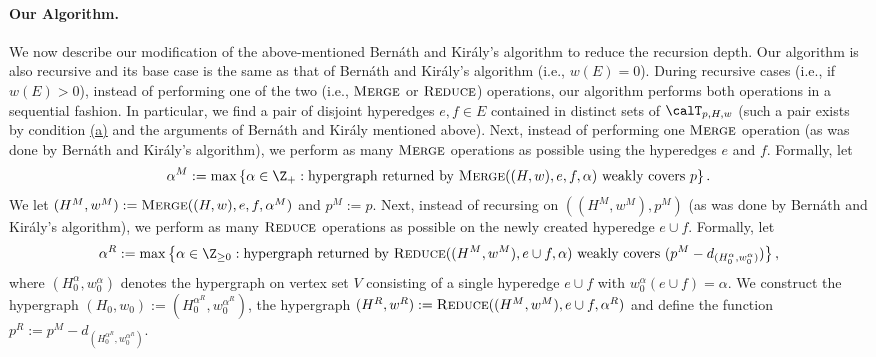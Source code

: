 \documentclass{article}
\newcommand{\maximalTightSetFamily}[1]{\ensuremath{\calT_{#1}}\xspace}
\newcommand{\shubhang}[1]{{\color{blue}[{\tiny Shubhang: \bf #1}]\marginpar{\color{blue}*}}}
\newcommand{\merge}{\ensuremath{\textsc{Merge}}\xspace}
\newcommand{\reduce}{\ensuremath{\textsc{Reduce}}\xspace}
\begin{document}
\paragraph{Our Algorithm.}
We now describe our modification of the above-mentioned Bern\'{a}th and Kir\'{a}ly's algorithm to reduce the recursion depth. Our algorithm is also recursive and its 
base case is the same as that of Bern\'{a}th and Kir\'{a}ly's algorithm (i.e., $w(E)=0$). During recursive cases (i.e., if $w(E) > 0$), instead of performing one of the two (i.e., \merge or  \reduce) operations, our algorithm performs both operations in a sequential fashion. In particular, we find a pair of disjoint hyperedges $e, f\in E$ contained in distinct sets of $\maximalTightSetFamily{p, H, w}$ (such a pair exists by condition \hyperlink{WeakToStrong(a)}{(a)} and the arguments of Bern\'{a}th and Kir\'{a}ly mentioned above). Next, 
instead of performing one \merge operation (as was done by Bern\'{a}th and Kir\'{a}ly's algorithm), we perform as many  \merge operations as possible %
using the hyperedges $e$ and $f$. 
Formally, let $$\alpha^M := \max\left\{\alpha \in \Z_+ : \text{hypergraph returned by } \merge((H, w), e, f, \alpha) \text{ weakly covers } p\right\}.$$
We let $(H^M, w^M):=\textsc{Merge}((H, w), e, f, \alpha^M)$ and $p^M:=p$.
Next, instead of recursing on $((H^M, w^M), p^M)$ (as was done by Bern\'{a}th and Kir\'{a}ly's algorithm), we perform as many \reduce operations as possible 
on the newly created hyperedge $e\cup f$.
Formally, let $$\alpha^R := \max\left\{\alpha \in \Z_{\ge 0}: \text{hypergraph returned by } \reduce((H^M, w^M), e \cup f, \alpha) \text{ weakly covers } (p^M - d_{(H_0^\alpha, w_0^\alpha)})\right\},$$
where $(H_0^{\alpha}, w_0^{\alpha})$ denotes
the hypergraph on vertex set $V$ consisting of a single hyperedge $e\cup f$ with $w_0^{\alpha}(e\cup f) = \alpha$. 
We construct the hypergraph 
$(H_0, w_0):=(H_0^{\alpha^R}, w_0^{\alpha^R})$, the hypergraph $(H^R, w^R):=\reduce((H^M, w^M), e\cup f, \alpha^R)$ and define the function $p^R:=p^M - d_{(H_0^{\alpha^R}, w_0^{\alpha^R})}$.
\end{document}
